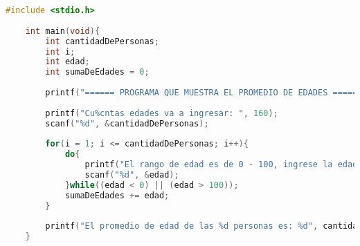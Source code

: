 \begin{lstlisting}[language=C, caption={Raíz cuadrana de N números positivos}, style=codigoenc]
	#include <stdio.h>
	
	int main(void){
		int cantidadDePersonas;
		int i;
		int edad;
		int sumaDeEdades = 0;
		
		printf("====== PROGRAMA QUE MUESTRA EL PROMEDIO DE EDADES ======\n\n");
		
		printf("Cu%cntas edades va a ingresar: ", 160);
		scanf("%d", &cantidadDePersonas);
		
		for(i = 1; i <= cantidadDePersonas; i++){
			do{
				printf("El rango de edad es de 0 - 100, ingrese la edad # %d: ", i);
				scanf("%d", &edad);
			}while((edad < 0) || (edad > 100));
			sumaDeEdades += edad;
		}
		
		printf("El promedio de edad de las %d personas es: %d", cantidadDePersonas, sumaDeEdades / cantidadDePersonas);
	}
\end{lstlisting}
